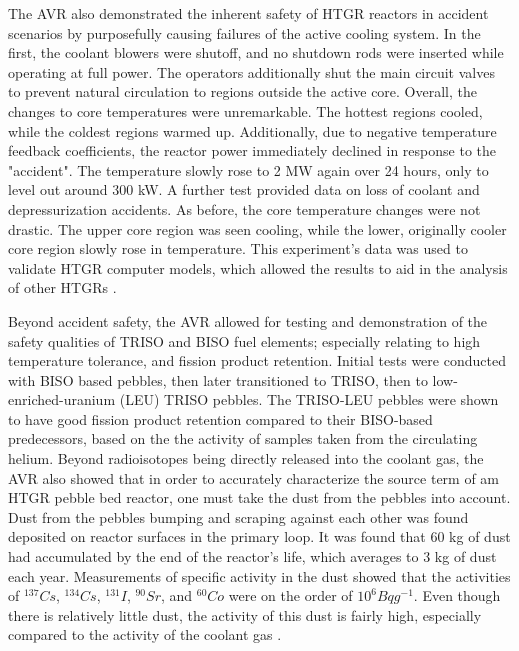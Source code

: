 The AVR also demonstrated the inherent safety of HTGR reactors in accident scenarios by purposefully causing failures of the active cooling system.  In the first, the coolant blowers were shutoff, and no shutdown rods were inserted while operating at full power.  The operators additionally shut the main circuit valves to prevent natural circulation to regions outside the active core.  Overall, the changes to core temperatures were unremarkable.  The hottest regions cooled, while the coldest regions warmed up.  Additionally, due to negative temperature feedback coefficients, the reactor power immediately declined in response to the "accident".  The temperature slowly rose to 2 MW again over 24 hours, only to level out around 300 kW.  A further test provided data on loss of coolant and depressurization accidents.  As before, the core temperature changes were not drastic.  The upper core region was seen cooling, while the lower, originally cooler core region slowly rose in temperature.  This experiment's data was used to validate HTGR computer models, which allowed the results to aid in the analysis of other HTGRs \cite{noauthor_results_1990}.

Beyond accident safety, the AVR allowed for testing and demonstration of the safety qualities of TRISO and BISO fuel elements; especially relating to high temperature tolerance, and fission product retention.  Initial tests were conducted with BISO based pebbles, then later transitioned to TRISO, then to low-enriched-uranium (LEU) TRISO pebbles.  The TRISO-LEU pebbles were shown to have good fission product retention compared to their BISO-based predecessors, based on the the activity of samples taken from the circulating helium.  Beyond radioisotopes being directly released into the coolant gas, the AVR also showed that in order to accurately characterize the source term of am HTGR pebble bed reactor, one must take the dust from the pebbles into account.  Dust from the pebbles bumping and scraping against each other was found deposited on reactor surfaces in the primary loop.  It was found that 60 kg of dust had accumulated by the end of the reactor's life, which averages to 3 kg of dust each year.  Measurements of specific activity in the dust showed that the activities of $^{137}Cs$, $^{134}Cs$, $^{131}I$, $^{90}Sr$, and $^{60}Co$ were on the order of $10^6 Bq g^{-1}$.  Even though there is relatively little dust, the activity of this dust is fairly high, especially compared to the activity of the coolant gas \cite{noauthor_results_1990}.

